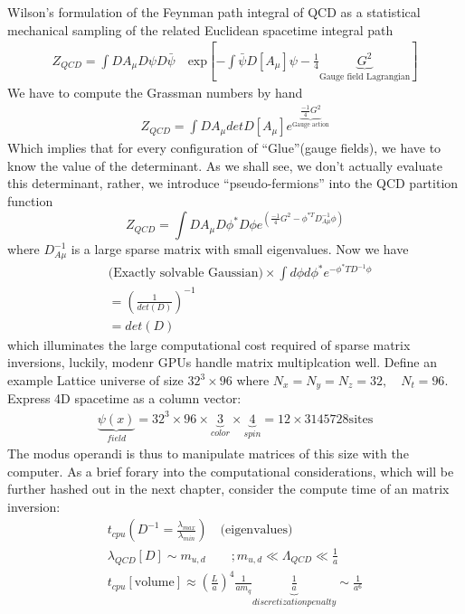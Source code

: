 Wilson's formulation of the Feynman path integral of QCD as a statistical mechanical sampling of the related Euclidean spacetime integral path 
\begin{align}
    Z_{QCD} = \int DA_\mu D\psi D\bar{\psi} \quad \text{exp}\left[-\int \bar{\psi}D[A_\mu]\psi - \frac{1}{4}\underbrace{G^2}_{\text{Gauge field Lagrangian}}\right]
\end{align}
We have to compute the Grassman numbers by hand 
\begin{align}
    Z_{QCD} = \int DA_\mu det D[A_\mu]e^{\underbrace{\frac{-1}{4}G^2}_{\text{Gauge action}}}
\end{align}
Which implies that for every configuration of ``Glue''(gauge fields), we have to know the value of the determinant. As we shall see, we don't actually evaluate this determinant, rather, we introduce ``pseudo-fermions'' into the QCD partition function 
\begin{equation}
    Z_{QCD} = \int DA_\mu D\phi^* D\phi e^{\left(\frac{-1}{4}G^2 - \phi^{*T}D_{A\mu}^{-1}\phi\right)}
\end{equation} where $D_{A\mu}^{-1}$ is a large sparse matrix with small eigenvalues. Now we have 
\begin{align}
    & \text{(Exactly solvable Gaussian)} \times \int d\phi d\phi^* e^{-\phi^*T D^{-1}\phi} \\ 
    &= \left(\frac{1}{det(D)}\right)^{-1} \\
    &= det(D)
\end{align}
which illuminates the large computational cost required of sparse matrix inversions, luckily, modenr GPUs handle matrix multiplcation well. Define an example Lattice universe of size $32^3 \times 96$ where $N_x=N_y=N_z = 32, \quad N_t=96$. Express 4D spacetime as a column vector: 
\begin{align}
   \underbrace{\psi(x)}_{field} = 32^3 \times 96 \times \underbrace{3}_{color} \times \underbrace{4}_{spin} = 12 \times 3145728 \text{sites} 
\end{align}
The modus operandi is thus to manipulate matrices of this size with the computer. 
As a brief forary into the computational considerations, which will be further hashed out in the next chapter, consider the compute time of an matrix inversion: 
\begin{align}
    t_{cpu}(D^{-1} = \frac{\lambda_{max}}{\lambda_{min}}) \quad \text{(eigenvalues)} \\ 
    \lambda_{QCD}[D] \sim m_{u,d} \qquad ; m_{u,d} \ll \Lambda_{QCD} \ll \frac{1}{a} \\
    t_{cpu}[\text{volume}] \approx \left(\frac{L}{a}\right)^4 \frac{1}{am_q} \underbrace{\frac{1}{a}}_{discretization penalty} \sim \frac{1}{a^6}
\end{align}  
